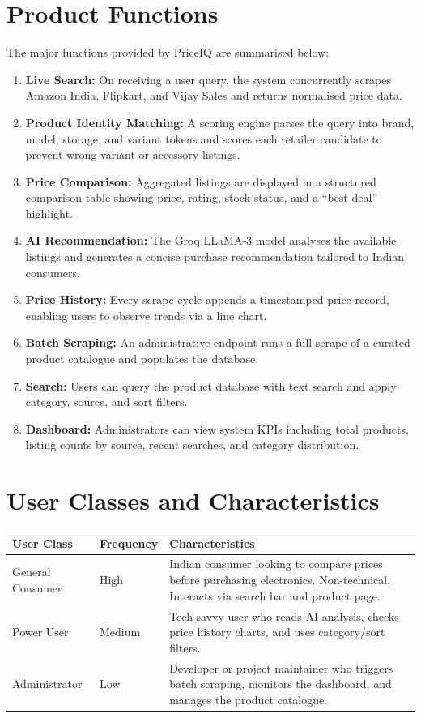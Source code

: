\documentclass[12pt,a4paper]{report}
\begin{document}
\section{Product Functions}
The major functions provided by PriceIQ are summarised below:

\begin{enumerate}[noitemsep]
  \item \textbf{Live Search:} On receiving a user query, the system concurrently
        scrapes Amazon India, Flipkart, and Vijay Sales and returns normalised
        price data.
  \item \textbf{Product Identity Matching:} A scoring engine parses the query
        into brand, model, storage, and variant tokens and scores each retailer
        candidate to prevent wrong-variant or accessory listings.
  \item \textbf{Price Comparison:} Aggregated listings are displayed in a
        structured comparison table showing price, rating, stock status, and
        a ``best deal'' highlight.
  \item \textbf{AI Recommendation:} The Groq LLaMA-3 model analyses the
        available listings and generates a concise purchase recommendation
        tailored to Indian consumers.
  \item \textbf{Price History:} Every scrape cycle appends a timestamped price
        record, enabling users to observe trends via a line chart.
  \item \textbf{Batch Scraping:} An administrative endpoint runs a full scrape
        of a curated product catalogue and populates the database.
  \item \textbf{Search:} Users can query the product database with text search
        and apply category, source, and sort filters.
  \item \textbf{Dashboard:} Administrators can view system KPIs including total
        products, listing counts by source, recent searches, and
        category distribution.
\end{enumerate}

\section{User Classes and Characteristics}

\begin{longtable}{L{2.5cm} L{3cm} L{7cm}}
  \toprule
  \textbf{User Class} & \textbf{Frequency} & \textbf{Characteristics} \\
  \midrule
  \endhead
  General Consumer &
  High &
  Indian consumer looking to compare prices before purchasing electronics.
  Non-technical. Interacts via search bar and product page. \\[4pt]
  Power User &
  Medium &
  Tech-savvy user who reads AI analysis, checks price history charts, and
  uses category/sort filters. \\[4pt]
  Administrator &
  Low &
  Developer or project maintainer who triggers batch scraping, monitors
  the dashboard, and manages the product catalogue. \\
  \bottomrule
\end{longtable}
\end{document}
